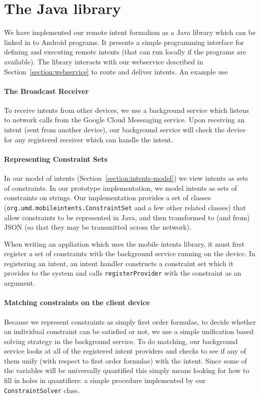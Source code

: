 \documentclass{acm_proc_article-sp}
\begin{document}
\section{The Java library}

We have implemented our remote intent formalism as a Java library
which can be linked in to Android programs.  It presents a simple
programming interface for defining and executing remote intents (that
can run locally if the programs are available).  The library interacts
with our webservice described in Section~\ref{section:webservice} to
route and deliver intents.  An example use 

\paragraph{The Broadcast Receiver}
To receive intents from other devices, we use a background service
which listens to network calls from the Google Cloud Messsaging
service.  Upon receiving an intent (sent from another device), our
background service will check the device for any registered receiver
which can handle the intent.

\paragraph{Representing Constraint Sets}

In our model of intents (Section~\ref{section:intents-model}) we view
intents as sets of constraints.  In our prototype implementation, we
model intents as sets of constraints on strings.  Our implementation
provides a set of classes
(\texttt{org.umd.mobileintents.ConstraintSet} and a few other related
classes) that allow constraints to be represented in Java, and then
transformed to (and from) JSON (so that they may be transmitted across
the network).

When writing an appliation which uses the mobile intents library, it
must first register a set of constraints with the background service
running on the device.  In registering an intent, an intent handler
constructs a constraint set which it provides to the system and calls
\texttt{registerProvider} with the constraint as an argument.

\paragraph{Matching constraints on the client device}

Because we represent constraints as simply first order formulae, to
decide whether an individual constraint can be satisfied or not, we
use a simple unification based solving strategy in the background
service.  To do matching, our background service looks at all of the
registered intent providers and checks to see if any of them unify
(with respect to first order formulae) with the intent.  Since some of
the variables will be universally quantified this simply means looking
for how to fill in holes in quantifiers: a simple procedure
implemented by our \texttt{ConstraintSolver} class.
\end{document}
